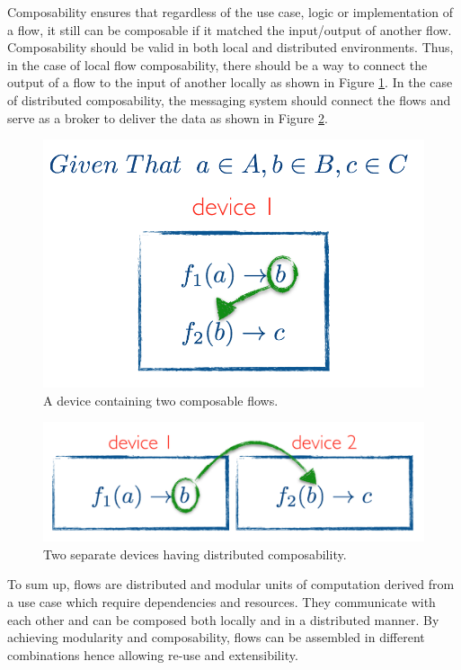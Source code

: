  \noindent Composability ensures that regardless of the use case, logic or implementation of a flow, it still can be composable if it matched the input/output of another flow. Composability should be valid in both local and distributed environments. Thus, in the case of local flow composability, there should be a way to connect the output of a flow to the input of another locally as shown in Figure \ref{fig:compose}. In the case of distributed composability, the messaging system should connect the flows and serve as a broker to deliver the data as shown in Figure \ref{fig:compose2}. 

\begin{figure}[H]
	\centering
	\includegraphics[scale=0.5]{images/local-compose.png} 
 	\caption{A device containing two composable flows.}
	\label{fig:compose}
\end{figure}
\begin{figure}[H]
	\centering
	\includegraphics[scale=0.5]{images/distributed-compose.png}
	\caption{Two separate devices having distributed composability.}
	\label{fig:compose2}
\end{figure}

\noindent To sum up, flows are distributed and modular units of computation derived from a use case which require dependencies and resources. They communicate with each other and can be composed both locally and in a distributed manner. By achieving  modularity and composability, flows can be assembled in different combinations hence allowing re-use and extensibility.
\newpage
